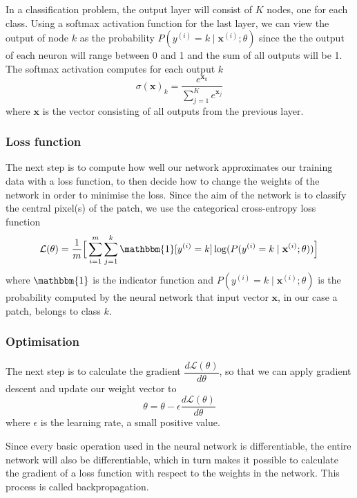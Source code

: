 \documentclass[12pt,a4paper,twoside,openright]{report}
\begin{document}
In a classification problem, the output layer will consist of $K$ nodes, one for each class. Using a softmax activation function for the last layer, we can view the output of node $k$ as the probability $P(y^{(i)} = k \mid \mathbf{x}^{(i)};\theta)$ since the the output of each neuron will range between 0 and 1 and the sum of all outputs will be 1. The softmax activation computes for each output $k$
\begin{equation}
	\sigma(\mathbf{x})_k = \frac{e^{\mathbf{x}_k}}{\sum_{j=1}^{K}e^{\mathbf{x}_j}}
\end{equation}
where $\mathbf{x}$ is the vector consisting of all outputs from the previous layer.

\subsubsection{Loss function}
The next step is to compute how well our network approximates our training data with a loss function, to then decide how to change the weights of the network in order to minimise the loss. Since the aim of the network is to classify the central pixel(s) of the patch, we use the categorical cross-entropy loss function
\begin{equation}
	\label{eq:loss}
	\mathcal{L}(\theta) = 
	\frac{1}{m}\Big[\sum_{i=1}^m \sum_{j=1}^k\mathbbm{1}[y^{(i)} = k]\log(P(y^{(i)}=k \mid \mathbf{x}^{(i)};\theta))\Big]
\end{equation}
where $\mathbbm{1}$ is the indicator function and $P(y^{(i)}=k \mid \mathbf{x}^{(i)};\theta)$ is the probability computed by the neural network that input vector $\mathbf{x}$, in our case a patch, belongs to class $k$.

\subsubsection{Optimisation}
The next step is to calculate the gradient $\dfrac{d\mathcal{L}(\theta)}{d\theta}$, so that we can apply gradient descent and update our weight vector to
\begin{equation}
	\theta = \theta - \epsilon \frac{d\mathcal{L}(\theta)}{d\theta}
\end{equation}
where $\epsilon$ is the learning rate, a small positive value.

Since every basic operation used in the neural network is differentiable, the entire network will also be differentiable, which in turn makes it possible to calculate the gradient of a loss function with respect to the weights in the network. This process is called backpropagation.
\end{document}
